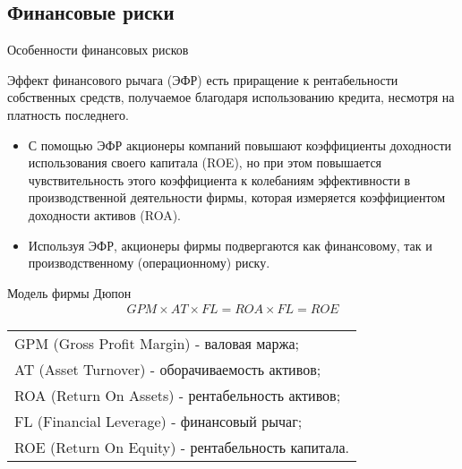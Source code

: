 \documentclass[financial_risks_lectures.tex]{subfiles}
\begin{document}
\subsection{Финансовые риски}
\begin{frame}[shrink=10]{Особенности финансовых рисков}
\begin{block}{Эффект финансового рычага (ЭФР)}
\quad есть приращение к рентабельности собственных средств, получаемое благодаря использованию кредита, несмотря на платность последнего.
\end{block}
\begin{itemize}[<+->]
\item
С помощью ЭФР акционеры компаний повышают коэффициенты доходности использования своего капитала (ROE), но при этом повышается чувствительность этого коэффициента к колебаниям эффективности в производственной деятельности фирмы, которая измеряется коэффициентом доходности активов (ROA). 
\item
Используя ЭФР, акционеры фирмы подвергаются как финансовому, так и производственному (операционному) риску.

\end{itemize}
\end{frame}

\begin{frame}{Модель фирмы Дюпон}
\begin{align}
\label{dupon}
GPM\times AT \times FL= ROA\times FL=ROE
\end{align}

\begin{tabular}{l}
GPM (Gross Profit Margin) - валовая маржа;\\
AT (Asset Turnover) - оборачиваемость активов;\\
ROA (Return On Assets) - рентабельность активов;\\
FL (Financial Leverage) - финансовый рычаг;\\
ROE (Return On Equity) - рентабельность капитала.\\
\end{tabular}
\end{frame}
\end{document}
